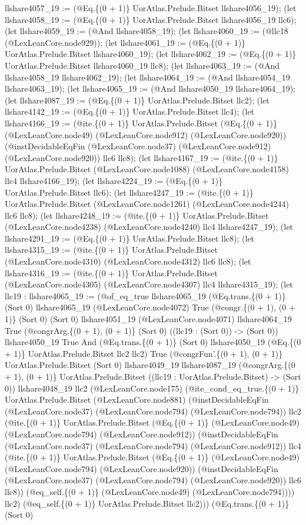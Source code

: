 \documentclass[11pt]{article}
\begin{document}
llshare4057\_19 := (@Eq.\{(0 + 1)\} UorAtlas.Prelude.Bitset llshare4056\_19); (let llshare4058\_19 := (@Eq.\{(0 + 1)\} UorAtlas.Prelude.Bitset llshare4056\_19 llc6); (let llshare4059\_19 := (@And llshare4058\_19); (let llshare4060\_19 := (@llc18 (@LexLeanCore.node929)); (let llshare4061\_19 := (@Eq.\{(0 + 1)\} UorAtlas.Prelude.Bitset llshare4060\_19); (let llshare4062\_19 := (@Eq.\{(0 + 1)\} UorAtlas.Prelude.Bitset llshare4060\_19 llc8); (let llshare4063\_19 := (@And llshare4058\_19 llshare4062\_19); (let llshare4064\_19 := (@And llshare4054\_19 llshare4063\_19); (let llshare4065\_19 := (@And llshare4050\_19 llshare4064\_19); (let llshare4087\_19 := (@Eq.\{(0 + 1)\} UorAtlas.Prelude.Bitset llc2); (let llshare4142\_19 := (@Eq.\{(0 + 1)\} UorAtlas.Prelude.Bitset llc4); (let llshare4166\_19 := (@ite.\{(0 + 1)\} UorAtlas.Prelude.Bitset (@Eq.\{(0 + 1)\} (@LexLeanCore.node49) (@LexLeanCore.node912) (@LexLeanCore.node920)) (@instDecidableEqFin (@LexLeanCore.node37) (@LexLeanCore.node912) (@LexLeanCore.node920)) llc6 llc8); (let llshare4167\_19 := (@ite.\{(0 + 1)\} UorAtlas.Prelude.Bitset (@LexLeanCore.node1088) (@LexLeanCore.node4158) llc4 llshare4166\_19); (let llshare4224\_19 := (@Eq.\{(0 + 1)\} UorAtlas.Prelude.Bitset llc6); (let llshare4247\_19 := (@ite.\{(0 + 1)\} UorAtlas.Prelude.Bitset (@LexLeanCore.node1261) (@LexLeanCore.node4244) llc6 llc8); (let llshare4248\_19 := (@ite.\{(0 + 1)\} UorAtlas.Prelude.Bitset (@LexLeanCore.node4238) (@LexLeanCore.node4240) llc4 llshare4247\_19); (let llshare4291\_19 := (@Eq.\{(0 + 1)\} UorAtlas.Prelude.Bitset llc8); (let llshare4315\_19 := (@ite.\{(0 + 1)\} UorAtlas.Prelude.Bitset (@LexLeanCore.node4310) (@LexLeanCore.node4312) llc6 llc8); (let llshare4316\_19 := (@ite.\{(0 + 1)\} UorAtlas.Prelude.Bitset (@LexLeanCore.node4305) (@LexLeanCore.node4307) llc4 llshare4315\_19); (let llc19 : llshare4065\_19 := (@of\_eq\_true llshare4065\_19 (@Eq.trans.\{(0 + 1)\} (Sort 0) llshare4065\_19 (@LexLeanCore.node4072) True (@congr.\{(0 + 1), (0 + 1)\} (Sort 0) (Sort 0) llshare4051\_19 (@LexLeanCore.node4071) llshare4064\_19 True (@congrArg.\{(0 + 1), (0 + 1)\} (Sort 0) ((llc19 : (Sort 0)) -> (Sort 0)) llshare4050\_19 True And (@Eq.trans.\{(0 + 1)\} (Sort 0) llshare4050\_19 (@Eq.\{(0 + 1)\} UorAtlas.Prelude.Bitset llc2 llc2) True (@congrFun'.\{(0 + 1), (0 + 1)\} UorAtlas.Prelude.Bitset (Sort 0) llshare4049\_19 llshare4087\_19 (@congrArg.\{(0 + 1), (0 + 1)\} UorAtlas.Prelude.Bitset ((llc19 : UorAtlas.Prelude.Bitset) -> (Sort 0)) llshare4048\_19 llc2 (@LexLeanCore.node175) (@ite\_cond\_eq\_true.\{(0 + 1)\} UorAtlas.Prelude.Bitset (@LexLeanCore.node881) (@instDecidableEqFin (@LexLeanCore.node37) (@LexLeanCore.node794) (@LexLeanCore.node794)) llc2 (@ite.\{(0 + 1)\} UorAtlas.Prelude.Bitset (@Eq.\{(0 + 1)\} (@LexLeanCore.node49) (@LexLeanCore.node794) (@LexLeanCore.node912)) (@instDecidableEqFin (@LexLeanCore.node37) (@LexLeanCore.node794) (@LexLeanCore.node912)) llc4 (@ite.\{(0 + 1)\} UorAtlas.Prelude.Bitset (@Eq.\{(0 + 1)\} (@LexLeanCore.node49) (@LexLeanCore.node794) (@LexLeanCore.node920)) (@instDecidableEqFin (@LexLeanCore.node37) (@LexLeanCore.node794) (@LexLeanCore.node920)) llc6 llc8)) (@eq\_self.\{(0 + 1)\} (@LexLeanCore.node49) (@LexLeanCore.node794)))) llc2) (@eq\_self.\{(0 + 1)\} UorAtlas.Prelude.Bitset llc2))) (@Eq.trans.\{(0 + 1)\} (Sort 0) 
\end{document}
